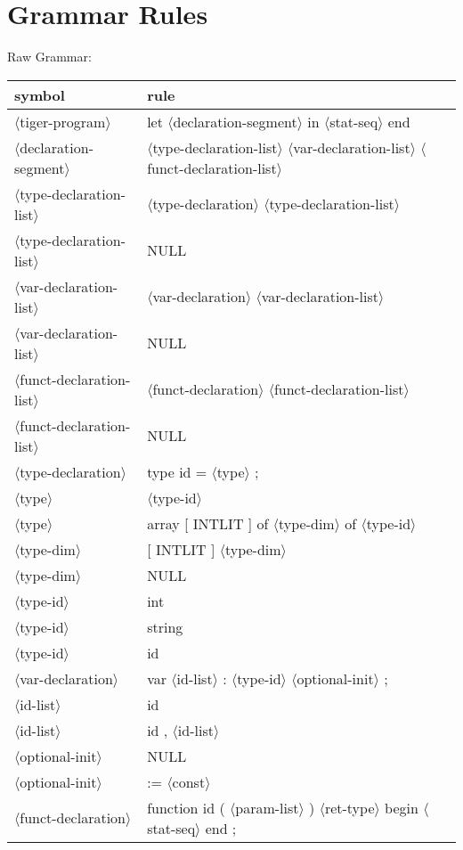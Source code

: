 \documentclass[11pt, fleqn]{article}
\newcommand{\atag}[1]{$\langle$#1$\rangle$}
\begin{document}
\section{Grammar Rules}

Raw Grammar:

\begin{longtable}{l|l}
symbol							&	rule								\\
\hline
\atag{tiger-program}				&	let \atag{declaration-segment} in \atag{stat-seq} end				\\
\atag{declaration-segment}		&	\atag{type-declaration-list}	\atag{var-declaration-list} \atag{funct-declaration-list}	\\
\atag{type-declaration-list}		&	\atag{type-declaration} \atag{type-declaration-list}	\\
\atag{type-declaration-list}		&	NULL		\\
\atag{var-declaration-list}		&	\atag{var-declaration} \atag{var-declaration-list}	\\
\atag{var-declaration-list}		&	NULL		\\
\atag{funct-declaration-list}	&	\atag{funct-declaration} \atag{funct-declaration-list}	\\
\atag{funct-declaration-list}	&	NULL		\\
\atag{type-declaration}			&	type id = \atag{type} ;		\\
\atag{type}						&	\atag{type-id}		\\
\atag{type}						&	array [ INTLIT ] of \atag{type-dim} of \atag{type-id}	\\
\atag{type-dim}					&	[ INTLIT ] \atag{type-dim}	\\
\atag{type-dim}					&	NULL		\\
\atag{type-id}					&	int		\\
\atag{type-id}					&	string		\\
\atag{type-id}					&	id		\\
\atag{var-declaration}			&	var \atag{id-list} : \atag{type-id} \atag{optional-init} ;		\\
\atag{id-list}					&	id		\\
\atag{id-list}					&	id , \atag{id-list}		\\
\atag{optional-init}				&	NULL		\\
\atag{optional-init}				&	:= \atag{const}		\\
\atag{funct-declaration}			&	function id ( \atag{param-list} ) \atag{ret-type} begin \atag{stat-seq} end ;	\\

\end{longtable}
\end{document}
